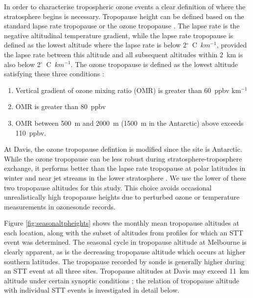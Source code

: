 \documentclass{article}
\begin{document}
    In order to characterise tropospheric ozone events a clear definition of where the stratosphere begins is necessary.
    Tropopause height can be defined based on the standard lapse rate tropopause \citep{WMO1957} or the ozone tropopause \citep{Bethan1996}.
    The lapse rate is the negative altitudinal temperature gradient, while the lapse rate tropopause is defined as the lowest altitude where the lapse rate is below 2$^\circ$~C~$km^{-1}$, provided the lapse rate between this altitude and all subsequent altitudes within 2~km is also below 2$^\circ$~C~$km^{-1}$.
    The ozone tropopause is defined as the lowest altitude satisfying these three conditions \citep{Bethan1996}:
    \begin{enumerate}
      \item Vertical gradient of ozone mixing ratio (OMR) is greater than 60~ppbv km$^{-1}$
      \item OMR is greater than 80~ppbv
      \item OMR between 500~m and 2000~m (1500~m in the Antarctic) above exceeds 110~ppbv.
    \end{enumerate}
    At Davis, the ozone tropopause defintion is modified since the site is Antarctic.
    While the ozone tropopause can be less robust during stratosphere-troposphere exchange, it performs better than the lapse rate tropopause at polar latitudes in winter and near jet streams in the lower stratosphere \citep{Bethan1996, Tomikawa2009, Alexander2013}. 
    We use the lower of these two tropopause altitudes for this study.
    This choice avoids occasional unrealistically high tropopause heights due to perturbed ozone or temperature measurements in ozonesonde records.
    
    Figure \ref{fig:seasonaltpheights} shows the monthly mean tropopause altitudes at each location, along with the subset of altitudes from profiles for which an STT event was determined. 
    The seasonal cycle in tropopause altitude at Melbourne is clearly apparent, as is the decreasing tropopause altitude which occurs at higher southern latitudes.
    The tropopause recorded by sonde is generally higher during an STT event at all three sites.
    Tropopause altitudes at Davis may exceed 11~km altitude under certain synoptic conditions \citep{Alexander2013}; the relation of tropopause altitude with individual STT events is investigated in detail below.
\end{document}
